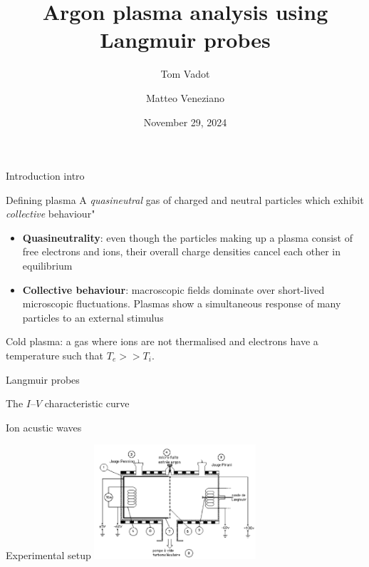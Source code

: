\documentclass[10pt]{beamer}
\title[(À enlever)]{Argon plasma analysis using Langmuir probes}
\author[Tom Vadot \and Matteo Veneziano]{Tom Vadot \and Matteo Veneziano}
\institute[]{EPFL Section of Physics}
\date{November 29, 2024}
\begin{document}
\begin{frame}
    \titlepage
\end{frame}


\begin{frame}{Introduction}
    intro
\end{frame}


\begin{frame}{Defining plasma}
    A \emph{quasineutral} gas of charged and neutral particles which exhibit \emph{collective} behaviour" 
    \vspace{0.5cm}
    \begin{itemize}
        \item \textbf{Quasineutrality}: even though the particles making up a plasma consist of free electrons and ions, their overall charge densities cancel each other in equilibrium 

        \item \textbf{Collective behaviour}: macroscopic fields dominate over short-lived microscopic fluctuations.
        Plasmas show a simultaneous response of many particles
        to an external stimulus
    \end{itemize}
    \vspace{0.5cm}
    Cold plasma: a gas where ions are not thermalised and electrons have a temperature such that $T_e >> T_i$.
\end{frame}


\begin{frame}{Langmuir probes}

\end{frame}


\begin{frame}{The $I$--$V$ characteristic curve}
    
\end{frame}


\begin{frame}{Ion acustic waves}
    
\end{frame}


\begin{frame}{Experimental setup}
    \includegraphics[width=6cm]{../figures/experimental-setup.png}
\end{frame}
\end{document}
